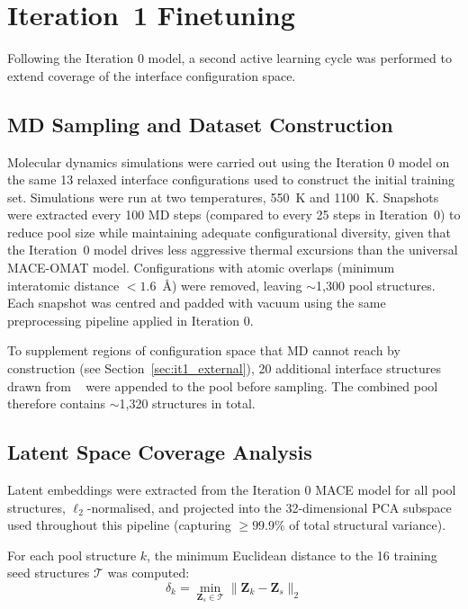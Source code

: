 \documentclass[12pt,a4paper,oneside]{book}
\begin{document}
\section{Iteration~1 Finetuning}
\label{sec:results_it1}

Following the Iteration 0 model, a second active learning cycle was performed to extend coverage of the interface configuration space.

\subsection{MD Sampling and Dataset Construction}

Molecular dynamics simulations were carried out using the Iteration 0 model on the same 13 relaxed interface configurations used to construct the initial training set. Simulations were run at two temperatures, 550~K and 1100~K. Snapshots were extracted every 100 MD steps (compared to every 25 steps in
Iteration~0) to reduce pool size while maintaining adequate configurational
diversity, given that the Iteration~0 model drives less aggressive thermal
excursions than the universal MACE-OMAT model. Configurations with atomic overlaps (minimum interatomic distance $<1.6$~\AA) were removed, leaving $\sim$1,300 pool structures. Each snapshot was centred and padded with vacuum using the same preprocessing pipeline applied in Iteration 0.

To supplement regions of configuration space that MD cannot reach by construction (see Section~\ref{sec:it1_external}), 20 additional interface structures drawn from \citeauthor{Burov2024LiLLZOChargeTransfer}~\cite{Burov2024LiLLZOChargeTransfer} were appended to the pool before sampling. The combined pool therefore contains $\sim$1,320 structures in total.

\subsection{Latent Space Coverage Analysis}

Latent embeddings were extracted from the Iteration 0 MACE model for all pool structures, $\ell_2$-normalised, and projected into the 32-dimensional PCA subspace used throughout this pipeline (capturing $\geq 99.9\%$ of total structural variance).

For each pool structure $k$, the minimum Euclidean distance to the 16 training seed structures $\mathcal{T}$ was computed:
\begin{equation}
    \delta_k = \min_{\mathbf{Z}_s \in \mathcal{T}} \|\mathbf{Z}_k - \mathbf{Z}_s\|_2
\end{equation}
\end{document}
